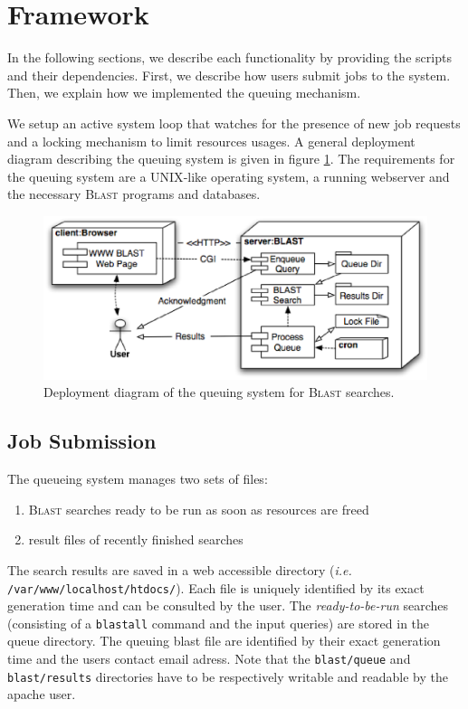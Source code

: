 \documentclass[USenglish]{scrartcl}
\newcommand{\noun}[1]{\textsc{#1}}
\begin{document}
\section*{Framework}

In the following sections, we describe each functionality by providing the scripts and their dependencies. First, we describe how users submit jobs to the system. Then, we explain how we implemented the queuing mechanism. 

We setup an active system loop that watches for the presence of new job requests and a locking mechanism to limit resources usages. A general deployment diagram describing the queuing system is given in figure \ref{fig}. The requirements for the queuing system are a \noun{UNIX}-like operating system, a running webserver and the necessary \noun{Blast} programs and databases.



\begin{figure}[h]
\begin{center}
	\includegraphics[width=12cm]{tiny_queuing_system_deployment0.eps}
	\caption{Deployment diagram of the queuing system for \noun{Blast} searches.}
	\label{fig}
\end{center}
\end{figure}

\subsection*{Job Submission}

The queueing system manages two sets of files: 
\begin{enumerate}
	\item \noun{Blast} searches ready to be run as soon as resources are freed
	\item result files of recently finished searches
\end{enumerate}
The search results are saved in a web accessible directory (\textit{i.e.} \texttt{/var/www/localhost/htdocs/}). Each file is uniquely identified by its exact generation time and can be consulted by the user. The \textit{ready-to-be-run} searches (consisting of a \texttt{blastall} command and the input queries) are stored in the queue directory. The queuing blast file are identified by their exact generation time and the users contact email adress. Note that the \texttt{blast/queue} and \texttt{blast/results} directories have to be respectively  writable and readable by the apache user.
\end{document}
